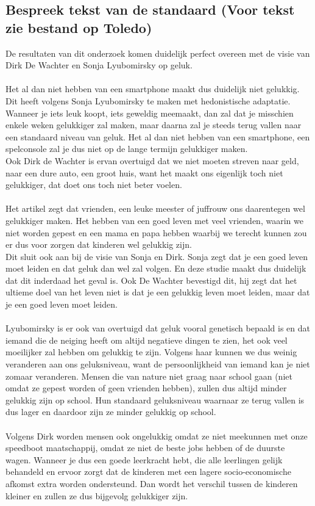 \documentclass[11pt,a4paper,titlepage]{article}
\begin{document}
\subsection{Bespreek tekst van de standaard (Voor tekst zie bestand op Toledo)}
De resultaten van dit onderzoek komen duidelijk perfect overeen met de visie van Dirk De Wachter en Sonja Lyubomirsky op geluk. \\  \\
Het al dan niet hebben van een smartphone maakt dus duidelijk niet gelukkig. Dit heeft volgens Sonja Lyubomirsky te maken met hedonistische adaptatie. Wanneer je iets leuk koopt, iets geweldig meemaakt, dan zal dat je misschien enkele weken gelukkiger zal maken, maar daarna zal je steeds terug vallen naar een standaard niveau van geluk. Het al dan niet hebben van een smartphone, een spelconsole zal je dus niet op de lange termijn gelukkiger maken. \\
Ook Dirk de Wachter is ervan overtuigd dat we niet moeten streven naar geld, naar een dure auto, een groot huis, want het maakt ons eigenlijk toch niet gelukkiger, dat doet ons toch niet beter voelen. \\ \\
Het artikel zegt dat vrienden, een leuke meester of juffrouw ons daarentegen wel gelukkiger maken. Het hebben van een goed leven met veel vrienden, waarin we niet worden gepest en een mama en papa hebben waarbij we terecht kunnen zou er dus voor zorgen dat kinderen wel gelukkig zijn.\\
Dit sluit ook aan bij de visie van Sonja en Dirk. Sonja zegt dat je een goed leven moet leiden en dat geluk dan wel zal volgen. En deze studie maakt dus duidelijk dat dit inderdaad het geval is. Ook De Wachter bevestigd dit, hij zegt dat het ultieme doel van het leven niet is dat je een gelukkig leven moet leiden, maar dat je een goed leven moet leiden. \\ \\
Lyubomirsky is er ook van overtuigd dat geluk vooral genetisch bepaald is en dat iemand die de neiging heeft om altijd negatieve dingen te zien, het ook veel moeilijker zal hebben om gelukkig te zijn. Volgens haar kunnen we dus weinig veranderen aan ons geluksniveau, want de persoonlijkheid van iemand kan je niet zomaar veranderen. Mensen die van nature niet graag naar school gaan (niet omdat ze gepest worden of geen vrienden hebben), zullen dus altijd minder gelukkig zijn op school. Hun standaard geluksniveau waarnaar ze terug vallen is dus lager en daardoor zijn ze minder gelukkig op school. \\ \\
Volgens Dirk worden mensen ook ongelukkig omdat ze niet meekunnen met onze speedboot maatschappij, omdat ze niet de beste jobs hebben of de duurste wagen. Wanneer je dus een goede leerkracht hebt, die alle leerlingen gelijk behandeld en ervoor zorgt dat de kinderen met een lagere socio-economische afkomst extra worden ondersteund. Dan wordt het verschil tussen de kinderen kleiner en zullen ze dus bijgevolg gelukkiger zijn.
\end{document}
